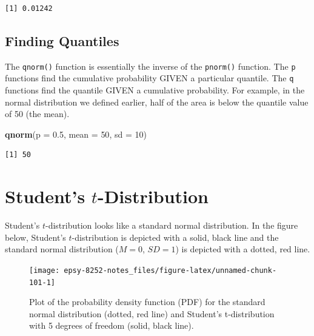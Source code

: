 \documentclass[]{book}
\newenvironment{Shaded}{\begin{snugshade}}{\end{snugshade}}
\newcommand{\DataTypeTok}[1]{\textcolor[rgb]{0.13,0.29,0.53}{#1}}
\newcommand{\DecValTok}[1]{\textcolor[rgb]{0.00,0.00,0.81}{#1}}
\newcommand{\FloatTok}[1]{\textcolor[rgb]{0.00,0.00,0.81}{#1}}
\newcommand{\KeywordTok}[1]{\textcolor[rgb]{0.13,0.29,0.53}{\textbf{#1}}}
\newcommand{\NormalTok}[1]{#1}
\begin{document}
\begin{verbatim}
[1] 0.01242
\end{verbatim}

\hypertarget{finding-quantiles}{%
\subsection{Finding Quantiles}\label{finding-quantiles}}

The \texttt{qnorm()} function is essentially the inverse of the \texttt{pnorm()} function. The \texttt{p} functions find the cumulative probability GIVEN a particular quantile. The \texttt{q} functions find the quantile GIVEN a cumulative probability. For example, in the normal distribution we defined earlier, half of the area is below the quantile value of 50 (the mean).

\begin{Shaded}
\begin{Highlighting}[]
\KeywordTok{qnorm}\NormalTok{(}\DataTypeTok{p =} \FloatTok{0.5}\NormalTok{, }\DataTypeTok{mean =} \DecValTok{50}\NormalTok{, }\DataTypeTok{sd =} \DecValTok{10}\NormalTok{)}
\end{Highlighting}
\end{Shaded}

\begin{verbatim}
[1] 50
\end{verbatim}

\hypertarget{students-t-distribution}{%
\section{\texorpdfstring{Student's \(t\)-Distribution}{Student's t-Distribution}}\label{students-t-distribution}}

Student's \(t\)-distribution looks like a standard normal distribution. In the figure below, Student's \(t\)-distribution is depicted with a solid, black line and the standard normal distribution (\(M=0\), \(SD=1\)) is depicted with a dotted, red line.

\begin{figure}

{\centering \texttt{[image: epsy-8252-notes\_files/figure-latex/unnamed-chunk-101-1]} 

}

\caption{Plot of the probability density function (PDF) for the standard normal distribution (dotted, red line) and Student's t-distribution with 5 degrees of freedom (solid, black line).}\label{fig:unnamed-chunk-101}
\end{figure}
\end{document}
